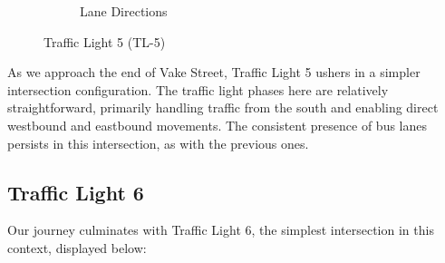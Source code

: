 \begin{figure}[h]
\begin{subfigure}{0.45\textwidth}
        \caption{Lane Directions}
    \end{subfigure}
    \caption{Traffic Light 5 (TL-5)}
    \label{fig:tl-5}
\end{figure}

As we approach the end of Vake Street, Traffic Light 5 ushers in a simpler intersection configuration. The traffic light phases here are relatively straightforward, primarily handling traffic from the south and enabling direct westbound and eastbound movements. The consistent presence of bus lanes persists in this intersection, as with the previous ones.

\subsection{Traffic Light 6} \label{sec:tl-6}
Our journey culminates with Traffic Light 6, the simplest intersection in this context, displayed below:

